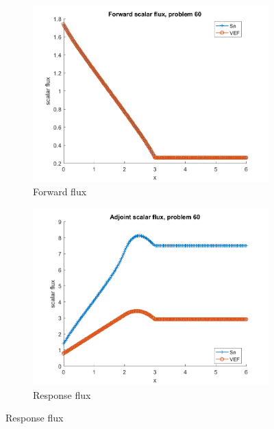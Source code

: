\documentclass{article}
\begin{document}
\begin{figure}[H]
\label{Case60Flux}
\centering
\begin{subfigure}{.5\textwidth}
  \centering
  \includegraphics[width=.98\linewidth]{IanProposal/figures2/60phi.png}
  \caption{Forward flux}
  \label{fig:sfig1}
\end{subfigure}%
\begin{subfigure}{.5\textwidth}
  \centering
  \includegraphics[width=.98\linewidth]{IanProposal/figures2/60phia.png}
  \caption{Response flux}
  \label{fig:sfig4}
\end{subfigure}%
\end{figure}
\end{document}
